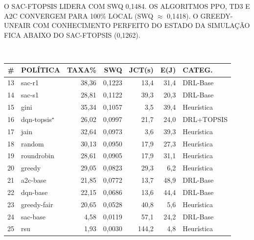 \documentclass{beamer}
\begin{document}
{\begin{frame}[plain, t]
\vspace{0.20cm}
\hspace{0.3cm}
\begin{minipage}{0.92\textwidth}
{\scriptsize\ttfamily\setlength{\baselineskip}{1.5\baselineskip}
O SAC-FTOPSIS LIDERA COM SWQ 0,1484. OS ALGORITMOS PPO, TD3 E A2C
CONVERGEM PARA 100\% LOCAL (SWQ $\approx$ 0,1418). O GREEDY-UNFAIR COM
CONHECIMENTO PERFEITO DO ESTADO DA SIMULAÇÃO FICA ABAIXO DO SAC-FTOPSIS (0,1262).
}
\end{minipage}

\end{frame}
}

{
\begin{frame}[plain, t]
\color{black}

\vspace{0.35cm}
\hspace{0.3cm}{\Large\bfseries\ttfamily AVALIAÇÃO COMPARATIVA — POSIÇÕES 13–25}\\[2pt]
\hspace{0.3cm}{\scriptsize\ttfamily 658 CENÁRIOS V2X $\bullet$ ORDENADO POR SWQ DECRESCENTE $\bullet$ $\star$ = USA TOPSIS}

\vspace{0.18cm}
\hspace{0.3cm}
{\tiny\ttfamily
\begin{tabular}{rlrrrrl}
\hline
\textbf{\#} & \textbf{POLÍTICA} & \textbf{TAXA\%} & \textbf{SWQ} & \textbf{JCT(s)} & \textbf{E(J)} & \textbf{CATEG.} \\
\hline
13 & sac-r1        & 38,36 & 0,1223 & 13,4 & 31,4 & DRL-Base   \\
14 & sac-s1        & 28,81 & 0,1122 & 39,3 & 20,3 & DRL-Base   \\
15 & gini          & 35,34 & 0,1057 &  3,5 & 39,4 & Heurística\\
16 & dqn-topsis$^\star$ & 26,02 & 0,0997 & 21,7 & 24,0 & DRL+TOPSIS \\
17 & jain          & 32,64 & 0,0973 &  3,6 & 39,3 & Heurística\\
18 & random        & 30,13 & 0,0950 & 17,9 & 27,3 & Heurística\\
19 & roundrobin    & 28,61 & 0,0905 & 17,9 & 31,1 & Heurística\\
20 & greedy        & 29,05 & 0,0823 & 29,3 &  6,2 & Heurística\\
21 & a2c-base      & 21,85 & 0,0772 & 13,7 & 48,9 & DRL-Base   \\
22 & dqn-base      & 22,15 & 0,0686 & 13,6 & 44,4 & DRL-Base   \\
23 & greedy-fair   & 20,65 & 0,0528 & 40,8 &  5,6 & Heurística\\
24 & sac-base      &  4,58 & 0,0119 & 57,1 & 24,2 & DRL-Base   \\
25 & rsu           &  1,93 & 0,0030 &144,2 &  4,8 & Heurística\\
\hline
\end{tabular}}


\end{frame}}
\end{document}
